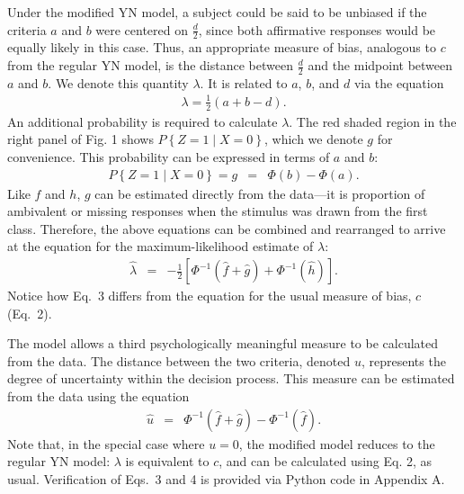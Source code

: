 \documentclass[man]{apa6}
\begin{document}
Under the modified YN model, a subject could be said to be unbiased if the criteria $a$ and $b$ were centered on $\frac{d}{2}$, since both affirmative responses would be equally likely in this case. Thus, an appropriate measure of bias, analogous to $c$ from the regular YN model, is the distance between $\frac{d}{2}$ and the midpoint between $a$ and $b$. We denote this quantity $\lambda$. It is related to $a$, $b$, and $d$ via the equation
\begin{eqnarray*}\lambda=\frac{1}{2}\left(a+b-d\right)\textrm{.}\end{eqnarray*} An additional probability is required to calculate $\lambda$. The red shaded region in the right panel of Fig. 1 shows $P\left\{Z=1\mid{}X=0\right\}$, which we denote $g$ for convenience. This probability can be expressed in terms of $a$ and $b$:
\begin{eqnarray*}
P\left\{Z=1\mid{}X=0\right\}=g&=&\Phi\left(b\right)-\Phi\left(a\right)\textrm{.}
\end{eqnarray*}
Like $f$ and $h$, $g$ can be estimated directly from the data---it is proportion of ambivalent or missing responses when the stimulus was drawn from the first class. Therefore, the above equations can be combined and rearranged to arrive at the equation for the maximum-likelihood estimate of $\lambda$:
\begin{eqnarray}
\hat{\lambda}&=&-\frac{1}{2}\left[\Phi^{-1}\left(\hat{f}+\hat{g}\right)+\Phi^{-1}\left(\hat{h}\right)\right]\textrm{.}
\end{eqnarray}Notice how Eq.~3 differs from the equation for the usual measure of bias, $c$ (Eq.~2).

The model allows a third psychologically meaningful measure to be calculated from the data. The distance between the two criteria, denoted $u$, represents the degree of uncertainty within the decision process. This measure can be estimated from the data using the equation
\begin{eqnarray}
\hat{u}&=&\Phi^{-1}\left(\hat{f}+\hat{g}\right)-\Phi^{-1}\left(\hat{f}\right)\textrm{.}
\end{eqnarray}Note that, in the special case where $u=0$, the modified model reduces to the regular YN model: $\lambda$ is equivalent to $c$, and can be calculated using Eq. 2, as usual. Verification of Eqs.~3 and 4 is provided via Python code in Appendix A.
\end{document}
